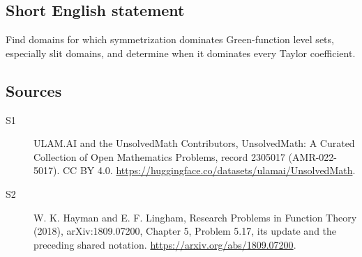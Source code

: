 \documentclass[11pt]{article}
\begin{document}
\subsection{Short English statement}
Find domains for which symmetrization dominates Green-function level sets, especially slit domains, and determine when it dominates every Taylor coefficient.
\subsection{Sources}
\begin{description}
\item[\hypertarget{source:2305017:1}{S1}] ULAM.AI and the UnsolvedMath Contributors, UnsolvedMath: A Curated Collection of Open Mathematics Problems, record 2305017 (AMR-022-5017). CC BY 4.0. \url{https://huggingface.co/datasets/ulamai/UnsolvedMath}.
\item[\hypertarget{source:2305017:2}{S2}] W. K. Hayman and E. F. Lingham, Research Problems in Function Theory (2018), arXiv:1809.07200, Chapter 5, Problem 5.17, its update and the preceding shared notation. \url{https://arxiv.org/abs/1809.07200}.
\end{description}
\label{end:2305017}
\end{document}
